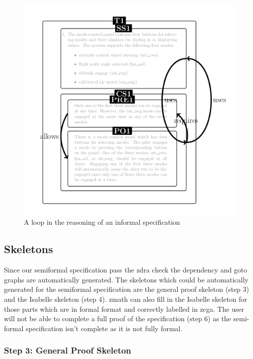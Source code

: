 \begin{figure}[H]
\begin{minipage}{0.45\textwidth}
     \includegraphics[width=\linewidth]{Figures/fullexample/ifincorrectout.png}
     \caption{A loop in the reasoning of an informal specification \label{fig:ifzdraincorrectout}}
     \end{minipage}
     \end{figure}

 \subsection{Skeletons}

 Since our semiformal specification pass the \gls{zdra} check the dependency and
 goto graphs are automatically generated. The skeletons which could be
 automatically generated for the semiformal specification are the general proof
 skeleton (step 3) and the Isabelle skeleton (step 4). \Gls{zmath} can also fill
 in the Isabelle skeleton for those parts which are in formal format and
 correctly labelled in \gls{zcga}. The user will not be able to complete a full
 proof of the specification (step 6) as the semi-formal specification isn't
 complete as it is not fully formal.

 \subsubsection{Step 3: General Proof Skeleton}

